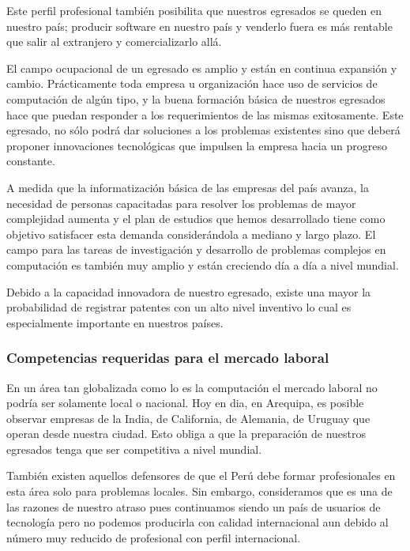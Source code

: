 Este perfil profesional también posibilita que nuestros egresados se queden en nuestro paí­s; 
producir software en nuestro paí­s y venderlo fuera es más rentable que salir al extranjero y comercializarlo allá.

El campo ocupacional de un egresado es amplio y están en continua expansión y cambio. 
Prácticamente toda empresa u organización hace uso de servicios de computación de algún tipo, y la buena 
formación básica de nuestros egresados hace que puedan responder a los requerimientos de las mismas exitosamente. 
Este egresado, no sólo podrá dar soluciones a los problemas existentes sino que deberá proponer innovaciones 
tecnológicas que impulsen la empresa hacia un progreso constante.

A medida que la informatización básica de las empresas del paí­s avanza, la necesidad de personas capacitadas 
para resolver los problemas de mayor complejidad aumenta y el plan de estudios que hemos desarrollado tiene 
como objetivo satisfacer esta demanda considerándola a mediano y largo plazo. El campo para las tareas de 
investigación y desarrollo de problemas complejos en computación es también muy amplio y están creciendo dí­a a dí­a a nivel mundial.

Debido a la capacidad innovadora de nuestro egresado, existe una mayor la probabilidad de registrar 
patentes con un alto nivel inventivo lo cual es especialmente importante en nuestros paí­ses.

\subsubsection{Competencias requeridas para el mercado laboral}
En un área tan globalizada como lo es la computación el mercado laboral no podrí­a ser solamente local o nacional.
Hoy en dia, en Arequipa, es posible observar empresas de la India, de California, de Alemania, de Uruguay que operan desde nuestra ciudad.
Esto obliga a que la preparación de nuestros egresados tenga que ser competitiva a nivel mundial.

También existen aquellos defensores de que el Perú debe formar profesionales en esta área solo para problemas locales.
Sin embargo, consideramos que es una de las razones de nuestro atraso pues continuamos siendo un paí­s de usuarios de 
tecnologí­a pero no podemos producirla con calidad internacional aun debido al número muy reducido de profesional con perfil internacional. 

